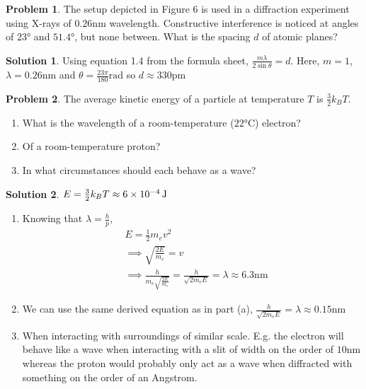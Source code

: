\documentclass[10pt]{article}
\theoremstyle{definition}
\newtheorem{problem}{Problem}
\newtheorem{soln}{Solution}
\begin{document}
\begin{problem}
The setup depicted in Figure 6 is used in a diffraction experiment using X-rays of $0.26\unit{\nano\meter}$ wavelength. Constructive interference is noticed
at angles of $23\unit{\degree}$ and $51.4\unit{\degree}$, but none between. What is the spacing $d$ of atomic planes?
\end{problem}
\begin{soln}
  Using equation 1.4 from the formula sheet, $\frac{m\lambda}{2\sin\theta}=d$. Here, $m=1$, $\lambda=0.26\unit{\nano\meter}$ and $\theta=\frac{23\pi}{180}\unit{\radian}$ so $d\approx330\unit{\pico\meter}$
\end{soln}

\begin{problem}
The average kinetic energy of a particle at temperature $T$ is $\frac{3}{2}k_BT$.
\begin{enumerate}[label=(\alph*)]
  \item What is the wavelength of a room-temperature ($22\unit{\degreeCelsius}$) electron?
  \item Of a room-temperature proton?
  \item In what circumstances should each behave as a wave?
\end{enumerate}
\end{problem}
\begin{soln}
  $E=\frac{3}{2}k_BT\approx\qty{6d-4}{\joule}$
  \begin{enumerate}[label=(\alph*)]
    \item Knowing that $\lambda=\frac{h}{p}$,
          \begin{align*}
             & E=\frac{1}{2}m_ev^2                                                                                    \\
             & \implies \sqrt{\frac{2E}{m_e}}=v                                                                       \\
             & \implies \frac{h}{m_e\sqrt{\frac{2E}{m_e}}}=\frac{h}{\sqrt{2m_eE}}=\lambda\approx6.3\unit{\nano\meter}
          \end{align*}
    \item We can use the same derived equation as in part (a), $\displaystyle\frac{h}{\sqrt{2m_eE}}=\lambda\approx0.15\unit{\nano\meter}$
    \item When interacting with surroundings of similar scale. E.g. the electron will behave like a wave when interacting with a slit of width on the order of $10\unit{\nano\meter}$ whereas
    the proton would probably only act as a wave when diffracted with something on the order of an Angstrom.
  \end{enumerate}
\end{soln}
\end{document}
